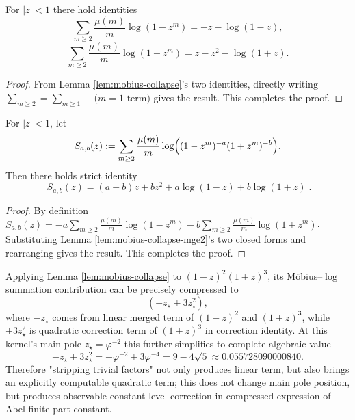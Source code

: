 \begin{lemma}[Explicit summation starting from \texorpdfstring{$m\ge 2$}{m>=2}]\label{lem:mobius-collapse-mge2}
For $|z|<1$ there hold identities
\[
\sum_{m\ge 2}\frac{\mu(m)}{m}\log(1-z^m)=-z-\log(1-z),
\]
\[
\sum_{m\ge 2}\frac{\mu(m)}{m}\log(1+z^m)=z-z^2-\log(1+z).
\]
\end{lemma}
\begin{proof}
From Lemma \ref{lem:mobius-collapse}'s two identities, directly writing
\(
\sum_{m\ge 2}=\sum_{m\ge 1}-\text{(}m=1\text{ term)}
\)
gives the result. This completes the proof.
\end{proof}

\begin{corollary}[General form: \texorpdfstring{$m\ge 2$}{m>=2} Möbius--$\log$ closed form for \texorpdfstring{$(1-z)^a(1+z)^b$}{(1-z)^a(1+z)^b}]\label{cor:mobius-collapse-mge2-ab}
For $|z|<1$, let
\[
S_{a,b}(z):=\sum_{m\ge 2}\frac{\mu(m)}{m}\log\Bigl((1-z^m)^{-a}(1+z^m)^{-b}\Bigr).
\]
Then there holds strict identity
\[
\boxed{\;
S_{a,b}(z)=(a-b)z+bz^2+a\log(1-z)+b\log(1+z)\; }.
\]
\end{corollary}

\begin{proof}
By definition
\(
S_{a,b}(z)=-a\sum_{m\ge 2}\frac{\mu(m)}{m}\log(1-z^m)-b\sum_{m\ge 2}\frac{\mu(m)}{m}\log(1+z^m)
\).
Substituting Lemma \ref{lem:mobius-collapse-mge2}'s two closed forms and rearranging gives the result. This completes the proof.
\end{proof}

\begin{remark}
Applying Lemma \ref{lem:mobius-collapse} to $(1-z)^2(1+z)^3$, its Möbius--$\log$ summation contribution can be precisely compressed to
\[
(-z_\star+3z_\star^2),
\]
where $-z_\star$ comes from linear merged term of $(1-z)^2$ and $(1+z)^3$, while $+3z_\star^2$ is quadratic correction term of $(1+z)^3$ in correction identity.
At this kernel's main pole $z_\star=\varphi^{-2}$ this further simplifies to complete algebraic value
\[
-z_\star+3z_\star^2
=-\varphi^{-2}+3\varphi^{-4}
=9-4\sqrt5
\approx 0.055728090000840.
\]
Therefore "stripping trivial factors" not only produces linear term, but also brings an explicitly computable quadratic term; this does not change main pole position, but produces observable constant-level correction in compressed expression of Abel finite part constant.
\end{remark}

